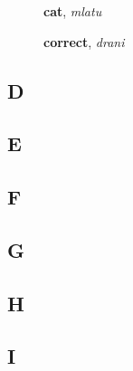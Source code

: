 \documentclass[12pt]{book}
\begin{document}
\begin{description}
\item[ ] \textbf{cat}, \textit{mlatu}
\item[ ] \textbf{correct}, \textit{drani} 
\end{description}

\subsection{D}

\begin{description}
\item[ ]
\end{description}

\subsection{E}

\begin{description}
\item[ ]
\end{description}

\subsection{F}

\begin{description}
\item[ ]
\end{description}

\subsection{G}

\begin{description}
\item[ ]
\end{description}

\subsection{H}

\begin{description}
\item[ ]
\end{description}

\subsection{I}
\end{document}
